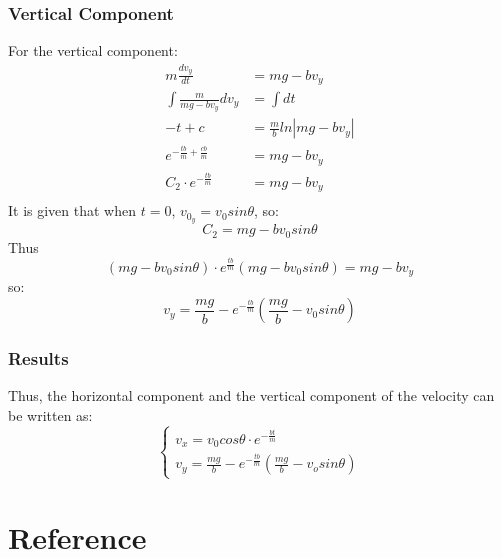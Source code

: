 \documentclass[conference]{IEEEtran}
\begin{document}
        \subsubsection{Vertical Component}
        For the vertical component:
        \begin{equation}
            \begin{aligned}
                m\frac{dv_y}{dt} &= mg-bv_y\\
                \int \frac{m}{mg-bv_y}dv_y &= \int dt\\
                -t + c &= \frac{m}{b}ln|mg-bv_y| \\
                e^{-\frac{tb}{m} + \frac{cb}{m}} &= mg-bv_y\\
                C_2\cdot e^{-\frac{tb}{m}} &= mg-bv_y\\
            \end{aligned}
        \end{equation}
        It is given that when $t = 0$, $v_{0_y} = v_0sin\theta$, so:
        $$C_2 = mg-bv_0sin\theta$$
        Thus
        $$(mg-bv_0sin\theta)\cdot e^{\frac{tb}{m}}(mg-bv_0sin\theta) = mg-bv_y$$
        so:
        \begin{equation} \label{y_air}
            v_y = \frac{mg}{b}-e^{-\frac{tb}{m}}(\frac{mg}{b}-v_0sin\theta)
        \end{equation}
        \subsubsection{Results}
        Thus, the horizontal component and the vertical component of the velocity can be written as:
        \begin{equation*}
            \begin{cases}
            v_x = v_0cos\theta\cdot e^{-\frac{bt}{m}}\\
            v_y = \frac{mg}{b} - e^{-\frac{tb}{m}}(\frac{mg}{b}-v_osin\theta)
            \end{cases}
        \end{equation*}
        
        
\section{Reference}
\printbibliography
\end{document}
